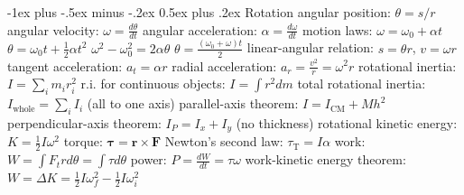 \documentclass[10pt,landscape]{article}
\makeatletter
\renewcommand{\subsection}{\@startsection{subsection}{2}{0mm}%
                                {-1ex plus -.5ex minus -.2ex}%
                                {0.5ex plus .2ex}%
                                {\normalfont\normalsize\bfseries}}
\newcommand{\spc}{\hspace*{1em}}
\makeatother
\begin{document}
\begin{multicols*}{3}
\subsection{Rotation}
angular position: $\theta =s/r$
\newline
angular velocity: $\omega =\frac{d\theta}{dt}$
\newline
angular acceleration: $\alpha =\frac{d\omega}{dt}$
\newline
motion laws:
\newline
\spc $\omega =\omega _0+\alpha t$
\newline
\spc $\theta =\omega _0t+\frac{1}{2}\alpha t^2$
\newline
\spc $\omega ^2-\omega _0^2=2\alpha \theta $
\newline
\spc $\theta =\frac{(\omega _0+\omega )t}{2}$
\newline
linear-angular relation: $s=\theta r$, $v=\omega r$
\newline
\spc tangent acceleration: $a_t=\alpha r$
\newline
\spc radial acceleration: $a_r=\frac{v^2}{r}=\omega ^2r$
\newline \newline
rotational inertia: $I=\sum _i m_i r_i^2$
\newline
\spc r.i. for continuous objects: $I=\int r^2dm$
\newline
total rotational inertia: $I_{\mathrm{whole}}=\sum _i I_i$ (all to one axis)
\newline
parallel-axis theorem: $I=I_{\mathrm{CM}}+Mh^2$
\newline
perpendicular-axis theorem: $I_P=I_x+I_y$ (no thickness)
\newline
rotational kinetic energy: $K=\frac{1}{2}I\omega ^2$
\newline
torque: $\boldsymbol{\tau } =\mathbf{r}\times \mathbf{F}$
\newline
Newton's second law: $\tau _\mathrm{T}=I\alpha $
\newline
work: $W=\int F_t rd\theta =\int \tau d\theta $
\newline
power: $P=\frac{dW }{dt}=\tau \omega $
\newline
work-kinetic energy theorem: $W=\Delta K=\frac{1}{2}I\omega _f^2-\frac{1}{2}I\omega _i^2$


\end{multicols*}
\end{document}
